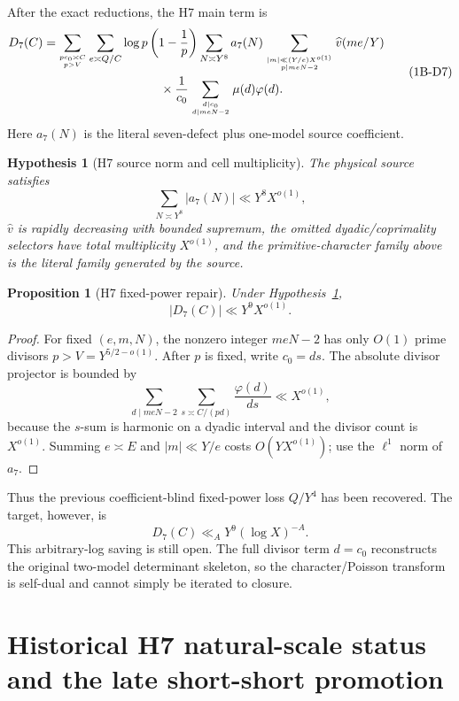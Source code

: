 \documentclass[11pt]{article}
\newtheorem{proposition}[theorem]{Proposition}
\newtheorem{hypothesis}[theorem]{Hypothesis}
\theoremstyle{definition}
\theoremstyle{remark}
\newcommand{\1}{\mathbf 1}
\begin{document}
After the exact reductions, the H7 main term is
\[
 \begin{aligned}
 D_7(C)=&\sum_{pc_0\asymp C\atop p>V}
 \sum_{e\asymp Q/C}
 \log p\left(1-\frac1p\right)
 \sum_{N\asymp Y^8}a_7(N)
 \sum_{|m|\ll(Y/e)X^{o(1)}\atop p\mid meN-2}
 \widehat v(me/Y)\\
 &\hspace{3cm}\times
 \frac1{c_0}
 \sum_{d\mid c_0\atop d\mid meN-2}\mu(d)\varphi(d).
 \end{aligned}
\tag{1B-D7}
\]
Here $a_7(N)$ is the literal seven-defect plus one-model source coefficient.

\begin{hypothesis}[H7 source norm and cell multiplicity]\label{hyp:H7norm}
The physical source satisfies
\[
 \sum_{N\asymp Y^8}|a_7(N)|\ll Y^8X^{o(1)},
\]
$\widehat v$ is rapidly decreasing with bounded supremum, the omitted dyadic/coprimality selectors have total
multiplicity $X^{o(1)}$, and the primitive-character family above is the literal family generated by the source.
\end{hypothesis}

\begin{proposition}[H7 fixed-power repair]\label{prop:H7power}
Under Hypothesis~\ref{hyp:H7norm},
\[
 \boxed{|D_7(C)|\ll Y^9X^{o(1)}.}
\tag{1B-H7power}
\]
\end{proposition}
\begin{proof}
For fixed $(e,m,N)$, the nonzero integer $meN-2$ has only $O(1)$ prime divisors $p>V=Y^{5/2-o(1)}$.
After $p$ is fixed, write $c_0=ds$.  The absolute divisor projector is bounded by
\[
 \sum_{d\mid meN-2}\sum_{s\asymp C/(pd)}\frac{\varphi(d)}{ds}\ll X^{o(1)},
\]
because the $s$-sum is harmonic on a dyadic interval and the divisor count is $X^{o(1)}$.  Summing
$e\asymp E$ and $|m|\ll Y/e$ costs $O(YX^{o(1)})$; use the $\ell^1$ norm of $a_7$.
\end{proof}

Thus the previous coefficient-blind fixed-power loss $Q/Y^4$ has been recovered.  The target, however, is
\[
 \boxed{D_7(C)\ll_A Y^9(\log X)^{-A}.}
\tag{H7-open}
\]
This arbitrary-log saving is still open.  The full divisor term $d=c_0$ reconstructs the original two-model
determinant skeleton, so the character/Poisson transform is self-dual and cannot simply be iterated to closure.


\section{Historical H7 natural-scale status and the late short-short promotion}
\label{sec:g1b-h7-promotion}
\end{document}
